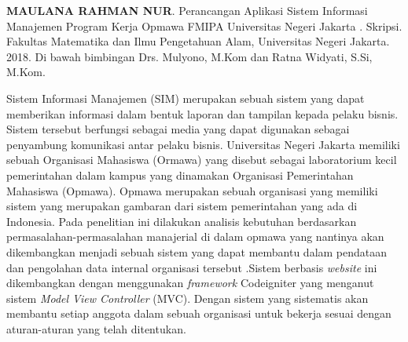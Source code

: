 \documentclass{jtetiskripsi}
\begin{document}


\begin{abstractind}
\textbf{MAULANA RAHMAN NUR}. Perancangan Aplikasi Sistem Informasi Manajemen Program Kerja Opmawa FMIPA Universitas Negeri Jakarta . Skripsi. Fakultas Matematika dan Ilmu Pengetahuan Alam, Universitas Negeri Jakarta. 2018. Di bawah bimbingan Drs. Mulyono, M.Kom dan Ratna Widyati, S.Si, M.Kom.
\vskip1cm

	Sistem Informasi Manajemen (SIM) merupakan sebuah sistem yang dapat memberikan informasi dalam bentuk laporan dan tampilan kepada pelaku bisnis. Sistem tersebut berfungsi sebagai media yang dapat digunakan sebagai penyambung komunikasi antar pelaku bisnis. Universitas Negeri Jakarta memiliki sebuah Organisasi Mahasiswa (Ormawa) yang disebut sebagai laboratorium kecil pemerintahan dalam kampus yang dinamakan Organisasi Pemerintahan Mahasiswa (Opmawa). Opmawa merupakan sebuah organisasi yang memiliki sistem yang merupakan gambaran dari sistem pemerintahan yang ada di Indonesia. Pada penelitian ini dilakukan analisis kebutuhan berdasarkan permasalahan-permasalahan manajerial di dalam opmawa yang nantinya akan dikembangkan menjadi sebuah sistem yang dapat membantu dalam pendataan dan pengolahan data internal organisasi tersebut  .Sistem berbasis \textit{website} ini dikembangkan dengan menggunakan \textit{framework} Codeigniter yang menganut sistem \textit{Model View Controller} (MVC). Dengan sistem yang sistematis akan membantu setiap anggota dalam sebuah organisasi untuk bekerja sesuai dengan aturan-aturan yang telah ditentukan. 
	

\end{abstractind}
\end{document}
